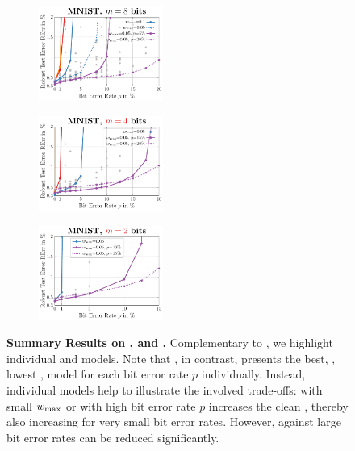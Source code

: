 \begin{figure}[t]
	\begin{subfigure}{0.26\textwidth}
		\includegraphics[height=3.1cm]{m_summary_8bit.pdf}
	\end{subfigure}
	\begin{subfigure}{0.24\textwidth}
		\includegraphics[height=3.1cm]{m_summary_4bit.pdf}
	\end{subfigure}
	\begin{subfigure}{0.24\textwidth}
		\includegraphics[height=3.1cm]{m_summary_2bit.pdf}
	\end{subfigure}
	\begin{subfigure}{0.24\textwidth}
	\end{subfigure}
	
	
	\hspace*{-0.1cm}
	\vspace*{-8px}
	\caption{\textbf{Summary Results on \CifarT, \CifarH and \MNIST.} Complementary to , we highlight individual \Clipping and \Random models. Note that , in contrast, presents the best, \ie, lowest \RTE, model for each bit error rate $p$ individually. Instead, individual models help to illustrate the involved trade-offs: \Clipping with small $\wmax$ or \Random with high bit error rate $p$ increases the clean \TE, thereby also increasing \RTE for very small bit error rates. However, \RTE against large bit error rates can be reduced significantly.}
	\label{fig:supp-summary}
\end{figure}

